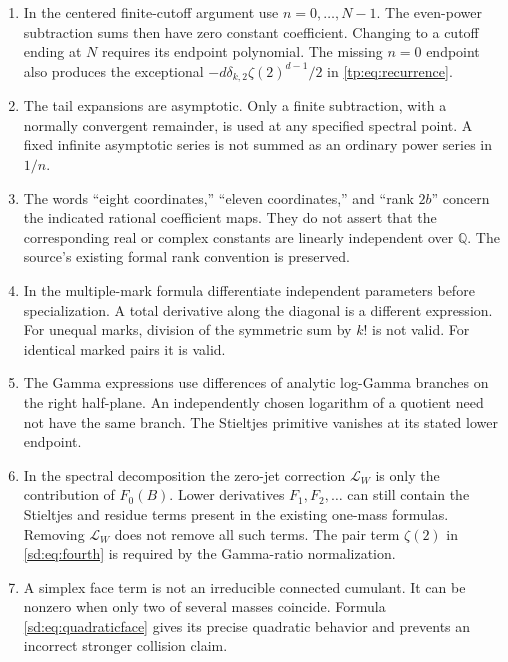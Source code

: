 \documentclass[11pt,a4paper]{article}
\numberwithin{equation}{section}
\theoremstyle{definition}
\theoremstyle{remark}
\begin{document}
\begin{enumerate}
\item In the centered finite-cutoff argument use $n=0,\ldots,N-1$.
The even-power subtraction sums then have zero constant coefficient.
Changing to a cutoff ending at $N$ requires its endpoint polynomial.
The missing $n=0$ endpoint also produces the exceptional
$-d\delta_{k,2}\zeta(2)^{d-1}/2$ in
\eqref{tp:eq:recurrence}.

\item The tail expansions are asymptotic. Only a finite subtraction,
with a normally convergent remainder, is used at any specified
spectral point. A fixed infinite asymptotic series is not summed as
an ordinary power series in $1/n$.

\item The words ``eight coordinates,'' ``eleven coordinates,'' and
``rank $2b$'' concern the indicated rational coefficient maps. They do
not assert that the corresponding real or complex constants are
linearly independent over $\mathbb Q$. The source's existing formal
rank convention is preserved.

\item In the multiple-mark formula differentiate independent parameters
before specialization. A total derivative along the diagonal is a
different expression. For unequal marks, division of the symmetric
sum by $k!$ is not valid. For identical marked pairs it is valid.

\item The Gamma expressions use differences of analytic log-Gamma
branches on the right half-plane. An independently chosen logarithm
of a quotient need not have the same branch. The Stieltjes primitive
vanishes at its stated lower endpoint.

\item In the spectral decomposition the zero-jet correction
$\mathcal L_W$ is only the contribution of $F_0(B)$. Lower derivatives
$F_1,F_2,\ldots$ can still contain the Stieltjes and residue terms
present in the existing one-mass formulas. Removing $\mathcal L_W$
does not remove all such terms. The pair term $\zeta(2)$ in
\eqref{sd:eq:fourth} is required by the Gamma-ratio normalization.

\item A simplex face term is not an irreducible connected cumulant.
It can be nonzero when only two of several masses coincide. Formula
\eqref{sd:eq:quadraticface} gives its precise quadratic behavior and
prevents an incorrect stronger collision claim.
\end{enumerate}
\end{document}
